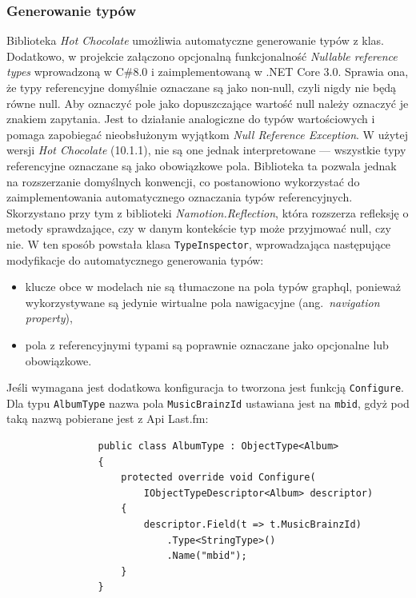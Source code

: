 		\subsubsection*{Generowanie typów}
			Biblioteka \emph{Hot Chocolate} umożliwia automatyczne generowanie typów z klas.
			Dodatkowo, w projekcie załączono opcjonalną funkcjonalność \emph{Nullable reference types} wprowadzoną w C\#8.0 i zaimplementowaną w .NET Core 3.0.
			Sprawia ona, że typy referencyjne domyślnie oznaczane są jako non-null, czyli nigdy nie będą równe null.
			Aby oznaczyć pole jako dopuszczające wartość null należy oznaczyć je znakiem zapytania.
			Jest to działanie analogiczne do typów wartościowych i pomaga zapobiegać nieobsłużonym wyjątkom \emph{Null Reference Exception}.
			W użytej wersji \emph{Hot Chocolate} (10.1.1), nie są one jednak interpretowane --- wszystkie typy referencyjne oznaczane są jako obowiązkowe pola.
			Biblioteka ta pozwala jednak na rozszerzanie domyślnych konwencji, co postanowiono wykorzystać do zaimplementowania automatycznego oznaczania typów referencyjnych.
			Skorzystano przy tym z biblioteki \emph{Namotion.Reflection}, która rozszerza refleksję o metody sprawdzające, czy w danym kontekście typ może przyjmować null, czy nie.
			W ten sposób powstała klasa \verb|TypeInspector|, wprowadzająca następujące modyfikacje do automatycznego generowania typów:
			\begin{itemize}
				\item klucze obce w modelach nie są tłumaczone na pola typów graphql, ponieważ wykorzystywane są jedynie wirtualne pola nawigacyjne (ang.\ \emph{navigation property}),
				\item pola z referencyjnymi typami są poprawnie oznaczane jako opcjonalne lub obowiązkowe.
			\end{itemize}

			Jeśli wymagana jest dodatkowa konfiguracja to tworzona jest funkcją \verb|Configure|.
			Dla typu \verb|AlbumType| nazwa pola \verb|MusicBrainzId| ustawiana jest na \verb|mbid|, gdyż pod taką nazwą pobierane jest z Api Last.fm:
			\begin{lstlisting}
				public class AlbumType : ObjectType<Album>
				{
					protected override void Configure(
						IObjectTypeDescriptor<Album> descriptor)
					{
						descriptor.Field(t => t.MusicBrainzId)
							.Type<StringType>()
							.Name("mbid");
					}
				}
			\end{lstlisting}


